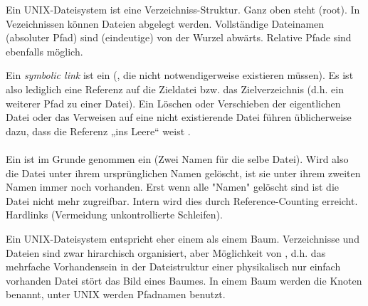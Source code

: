 \begin{answer}
  Ein UNIX-Dateisystem ist eine  Verzeichniss-Struktur. Ganz oben steht  (root). In Vezeichnissen können Dateien abgelegt werden. Vollständige Dateinamen (absoluter Pfad) sind (eindeutige)  von der Wurzel abwärts. Relative Pfade sind ebenfalls möglich.
\end{answer}

\begin{answer}
  Ein \textit{ symbolic link} ist ein  (, die nicht notwendigerweise existieren müssen). Es ist also lediglich eine Referenz auf die Zieldatei bzw. das Zielverzeichnis (d.h. ein weiterer Pfad zu einer Datei). Ein Löschen oder Verschieben der eigentlichen Datei oder das Verweisen auf eine nicht existierende Datei führen üblicherweise dazu, dass die Referenz „ins Leere“ weist .

  \paragraph*{}
  Ein  ist im Grunde genommen ein  (Zwei Namen für die selbe Datei). Wird also die Datei unter ihrem ursprünglichen Namen gelöscht, ist sie unter ihrem zweiten Namen immer noch vorhanden. Erst wenn alle "Namen" gelöscht sind ist die Datei nicht mehr zugreifbar. Intern wird dies durch Reference-Counting erreicht. Hardlinks  (Vermeidung unkontrollierte Schleifen).
\end{answer}

\begin{answer}
  Ein UNIX-Dateisystem entspricht eher einem  als einem Baum. Verzeichnisse und Dateien sind zwar hirarchisch organisiert, aber Möglichkeit von , d.h. das mehrfache Vorhandensein in der Dateistruktur einer physikalisch nur einfach vorhanden Datei stört das Bild eines Baumes. In einem Baum werden die Knoten benannt, unter UNIX werden Pfadnamen benutzt.
\end{answer}

